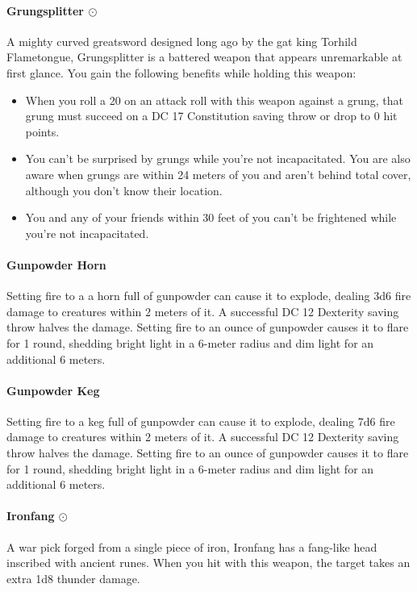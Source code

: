     \paragraph{Grungsplitter $\odot$}
        A mighty curved greatsword designed long ago by the gat king Torhild Flametongue, Grungsplitter is a battered weapon that appears unremarkable at first glance.
        You gain the following benefits while holding this weapon:
        \begin{itemize}
            \item When you roll a 20 on an attack roll with this weapon against a grung, that grung must succeed on a DC 17 Constitution saving throw or drop to 0 hit points.
            \item You can't be surprised by grungs while you're not incapacitated.
            You are also aware when grungs are within 24 meters of you and aren't behind total cover, although you don't know their location.
            \item You and any of your friends within 30 feet of you can't be frightened while you're not incapacitated.
        \end{itemize}
    \paragraph{Gunpowder Horn}
        Setting fire to a a horn full of gunpowder can cause it to explode, dealing 3d6 fire damage to creatures within 2 meters of it.
        A successful DC 12 Dexterity saving throw halves the damage.
        Setting fire to an ounce of gunpowder causes it to flare for 1 round, shedding bright light in a 6-meter radius and dim light for an additional 6 meters.
    \paragraph{Gunpowder Keg}
        Setting fire to a keg full of gunpowder can cause it to explode, dealing 7d6 fire damage to creatures within 2 meters of it.
        A successful DC 12 Dexterity saving throw halves the damage.
        Setting fire to an ounce of gunpowder causes it to flare for 1 round, shedding bright light in a 6-meter radius and dim light for an additional 6 meters.
    \paragraph{Ironfang $\odot$}
        A war pick forged from a single piece of iron, Ironfang has a fang-like head inscribed with ancient runes.
        When you hit with this weapon, the target takes an extra 1d8 thunder damage.

